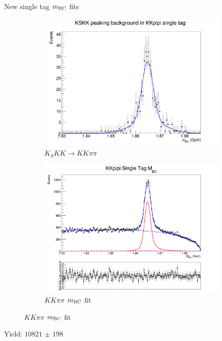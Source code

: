 \documentclass{beamer}
\begin{document}
\begin{frame}{New single tag $m_{\rm BC}$ fits}
  \begin{figure}
    \centering
    \begin{subfigure}{0.49\textwidth}
      \centering
      \includegraphics[width=\textwidth]{Plots/KSKKtoKKpipi_Fit.png}
      \caption{$K_SKK\to KK\pi\pi$}
    \end{subfigure}%
    \begin{subfigure}{0.49\textwidth}
      \centering
      \includegraphics[width=\textwidth]{Plots/KKpipi_SingleTag_MBC_Plot.png}
      \caption{$KK\pi\pi$ $m_{\rm BC}$ fit}
    \end{subfigure}
  \end{figure}
  \begin{center}
    Yield: $\SI{10821(198)}{}$
  \end{center}
\end{frame}
\end{document}
